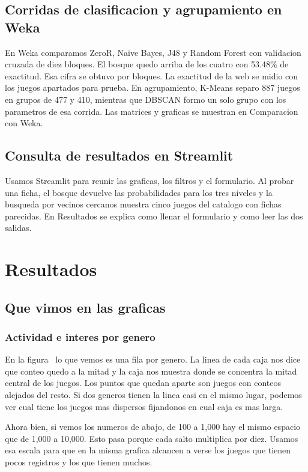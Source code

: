 \subsection{Corridas de clasificacion y agrupamiento en Weka}
En Weka comparamos ZeroR, Naive Bayes, J48 y Random Forest con validacion cruzada de diez bloques. El bosque quedo arriba de los cuatro con 53.48\% de exactitud. Esa cifra se obtuvo por bloques. La exactitud de la web se midio con los juegos apartados para prueba. En agrupamiento, K-Means separo 887 juegos en grupos de 477 y 410, mientras que DBSCAN formo un solo grupo con los parametros de esa corrida. Las matrices y graficas se muestran en Comparacion con Weka.

\subsection{Consulta de resultados en Streamlit}
Usamos Streamlit para reunir las graficas, los filtros y el formulario. Al probar una ficha, el bosque devuelve las probabilidades para los tres niveles y la busqueda por vecinos cercanos muestra cinco juegos del catalogo con fichas parecidas. En Resultados se explica como llenar el formulario y como leer las dos salidas.

\section{Resultados}
\subsection{Que vimos en las graficas}
\subsubsection{Actividad e interes por genero}
En la figura~ lo que vemos es una fila por genero. La linea de cada caja nos dice que conteo quedo a la mitad y la caja nos muestra donde se concentra la mitad central de los juegos. Los puntos que quedan aparte son juegos con conteos alejados del resto. Si dos generos tienen la linea casi en el mismo lugar, podemos ver cual tiene los juegos mas dispersos fijandonos en cual caja es mas larga.

Ahora bien, si vemos los numeros de abajo, de 100 a 1,000 hay el mismo espacio que de 1,000 a 10,000. Esto pasa porque cada salto multiplica por diez. Usamos esa escala para que en la misma grafica alcancen a verse los juegos que tienen pocos registros y los que tienen muchos.

